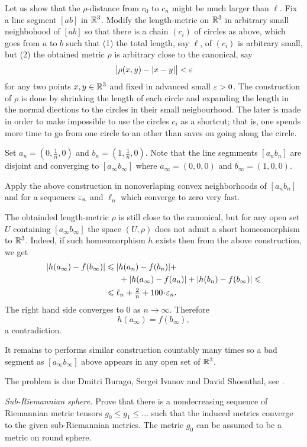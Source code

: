 Let us show that the $\rho$-distance from $c_0$ to $c_n$ might be much larger than $\ell$.
Fix a line segment $[ab]$ in $\mathbb{R}^3$.
Modify 
the length-metric on $\mathbb{R}^3$ in arbitrary small neighbohood of $[ab]$
so that there is a chain $(c_i)$ of circles as above,
which goes from $a$ to $b$ 
such that
(1) the total length, say $\ell$, 
of $(c_i)$ is arbitrary small,
but 
(2) the obtained metric $\rho$ 
is arbitrary close to the canonical, say
\[\bigl|\rho(x,y)-|x-y|\bigr|<\varepsilon\]
for any two points $x,y\in\mathbb{R}^3$
and fixed in advanced small $\varepsilon>0$.
The construction of $\rho$ 
is done by shrinking the length of each circle
and expanding the length in the normal diections  
to the circles in their small neigbourhood.
The later is made in order to make impossible to use the circles $c_i$ as a shortcut;
that is, one spends more time to go from one circle to an other 
than saves on going along the circle.

Set $a_n=(0,\tfrac1n,0)$ and $b_n=(1,\tfrac1n,0)$.
Note that the line segmments $[a_nb_n]$ are disjoint and converging
to $[a_\infty b_\infty]$
where $a_\infty=(0,0,0)$ and $b_\infty=(1,0,0)$.

Apply the above construction in nonoverlaping convex neighborhoods of $[a_nb_n]$ 
and for a sequences 
$\varepsilon_n$ and $\ell_n$ 
which converge to zero very fast.

The obtainded length-metric $\rho$ is still close to the canonical,
but for any open set $U$ containing $[a_\infty b_\infty]$
the space $(U,\rho)$ does not admit 
a short homeomorphism to $\mathbb{R}^3$.
Indeed, if such homeomorphism $h$
exists then 
from the above construction,
we get 
\begin{align*}
|h(a_\infty)-f(b_\infty)|
&\le 
|h(a_n)-f(b_n)|
+
\\
&\ \ \ \ \ +
|h(a_\infty)-f(a_n)|
+
|h(b_n)-f(b_\infty)|
\le
\\
&\le
\ell_n+\tfrac2n+100\cdot\eps_n.
\end{align*}
The right hand side converges to $0$ as $n\to\infty$.
Therefore 
\[h(a_\infty)=f(b_\infty),\] 
a contradiction.

It remains to performs similar construction countably many times so a bad segment as $[a_\infty b_\infty]$ above
appears in any open set of $\mathbb{R}^3$.


The problem is due
Dmitri Burago, 
Sergei Ivanov 
and David Shoenthal,
see \cite{BIS}.

\textit{Sub-Riemannian sphere.}
Prove that there is a nondecreasing sequence of Riemannian metric tensors
$g_0\le g_1\le ...$ such that the induced metrics converge to the given sub-Riemannian metrics.
The metric $g_0$ can be assumed to be a metric on round sphere.

